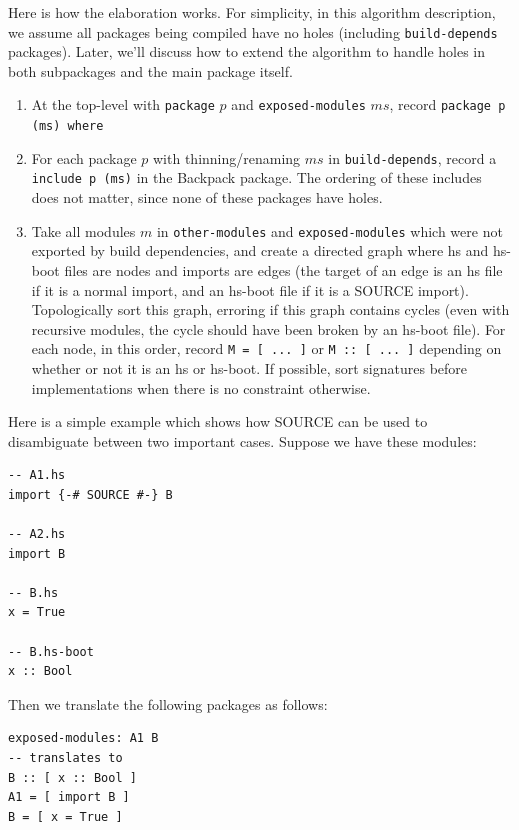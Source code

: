 \documentclass{article}
\begin{document}
Here is how the elaboration works.  For simplicity, in this algorithm
description, we assume all packages being compiled have no holes
(including \verb|build-depends| packages). Later, we'll discuss how to
extend the algorithm to handle holes in both subpackages and the main
package itself.

\begin{enumerate}

    \item At the top-level with \verb|package| $p$ and
        \verb|exposed-modules| $ms$, record \verb|package p (ms) where|

    \item For each package $p$ with thinning/renaming $ms$ in
        \verb|build-depends|, record a \verb|include p (ms)| in the
        Backpack package.  The ordering of these includes does not
        matter, since none of these packages have holes.

    \item Take all modules $m$ in \verb|other-modules| and
        \verb|exposed-modules| which were not exported by build
        dependencies, and create a directed graph where hs and hs-boot
        files are nodes and imports are edges (the target of an edge is
        an hs file if it is a normal import, and an hs-boot file if it
        is a SOURCE import).  Topologically sort this graph, erroring if
        this graph contains cycles (even with recursive modules, the
        cycle should have been broken by an hs-boot file).  For each
        node, in this order, record \verb|M = [ ... ]| or \verb|M :: [ ... ]|
        depending on whether or not it is an hs or hs-boot.  If possible,
        sort signatures before implementations when there is no constraint
        otherwise.

\end{enumerate}

Here is a simple example which shows how SOURCE can be used to disambiguate
between two important cases. Suppose we have these modules:

\begin{verbatim}
-- A1.hs
import {-# SOURCE #-} B

-- A2.hs
import B

-- B.hs
x = True

-- B.hs-boot
x :: Bool
\end{verbatim}

Then we translate the following packages as follows:

\begin{verbatim}
exposed-modules: A1 B
-- translates to
B :: [ x :: Bool ]
A1 = [ import B ]
B = [ x = True ]
\end{verbatim}
\end{document}
